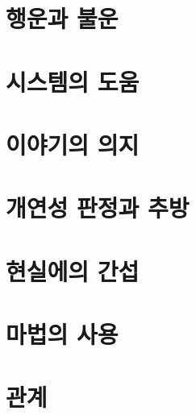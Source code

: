 \documentclass{report}
\begin{document}
	\section{행운과 불운}
		
	
	\section{시스템의 도움}
		
	
	\section{이야기의 의지}
		
	
	\section{개연성 판정과 추방}
		
	
	\section{현실에의 간섭}
		
	
	\section{마법의 사용}
		
	
	\section{관계}
		
	
\end{document}
